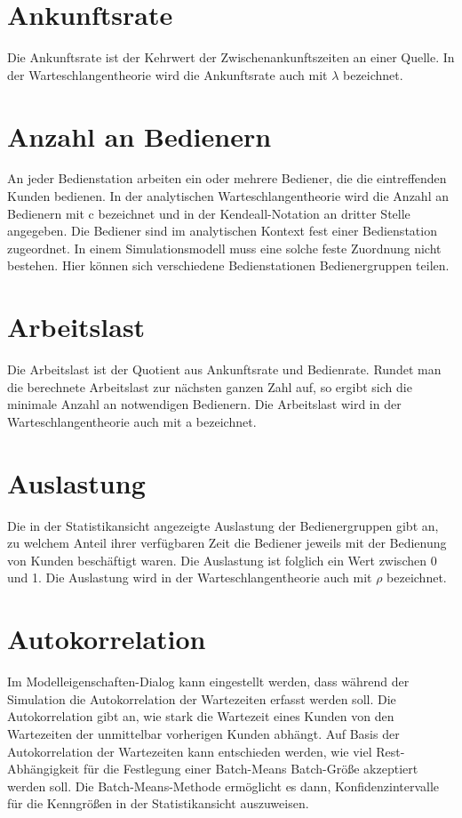 \section*{Ankunftsrate}


Die Ankunftsrate ist der Kehrwert der Zwischenankunftszeiten an einer Quelle.
In der Warteschlangentheorie wird die Ankunftsrate auch mit $\lambda$ bezeichnet.

\section*{Anzahl an Bedienern}


An jeder Bedienstation arbeiten ein oder mehrere Bediener,
die die eintreffenden Kunden bedienen. In der analytischen Warteschlangentheorie
wird die Anzahl an Bedienern mit c bezeichnet und in der Kendeall-Notation an dritter Stelle angegeben. Die Bediener
sind im analytischen Kontext fest einer Bedienstation zugeordnet. In einem Simulationsmodell muss eine solche
feste Zuordnung nicht bestehen. Hier können sich verschiedene Bedienstationen Bedienergruppen teilen.

\section*{Arbeitslast}


Die Arbeitslast ist der Quotient aus Ankunftsrate und Bedienrate. Rundet man die berechnete Arbeitslast zur
nächsten ganzen Zahl auf, so ergibt sich die minimale Anzahl an notwendigen Bedienern. Die Arbeitslast wird in der
Warteschlangentheorie auch mit a bezeichnet.

\section*{Auslastung}


Die in der Statistikansicht angezeigte Auslastung der Bedienergruppen gibt an,
zu welchem Anteil ihrer verfügbaren Zeit die Bediener jeweils mit der Bedienung von Kunden beschäftigt waren.
Die Auslastung ist folglich ein Wert zwischen 0 und 1. Die Auslastung wird in der
Warteschlangentheorie auch mit $\rho$ bezeichnet.

\section*{Autokorrelation}


Im Modelleigenschaften-Dialog kann eingestellt werden, dass während der
Simulation die Autokorrelation der Wartezeiten erfasst werden soll. Die Autokorrelation gibt an, wie stark
die Wartezeit eines Kunden von den Wartezeiten der unmittelbar vorherigen Kunden abhängt. Auf Basis der
Autokorrelation der Wartezeiten kann entschieden werden, wie viel Rest-Abhängigkeit für die Festlegung einer
Batch-Means Batch-Größe akzeptiert werden soll. Die Batch-Means-Methode ermöglicht es dann,
Konfidenzintervalle für die Kenngrößen in der Statistikansicht
auszuweisen.

